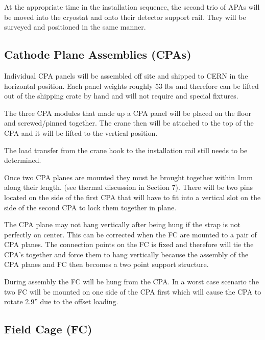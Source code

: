 At the appropriate time in the installation sequence, the second trio of APAs will be moved into the cryostat and onto their detector support rail.  They will be surveyed and positioned in the same manner.


\subsection{Cathode Plane Assemblies (CPAs)}



Individual CPA panels will be assembled off site and shipped to CERN in the horizontal position.  Each panel weights roughly 53 lbs and therefore can be lifted out of the shipping crate by hand and will not require and special fixtures.

The three CPA modules that made up a CPA panel will be placed on the floor and screwed/pinned together.   The crane then will be attached to the top of the CPA and it will be lifted to the vertical position.  

The load transfer from the crane hook to the installation rail still needs to be determined.  

Once two CPA planes are mounted they must be brought together within 1mm along their length.  (see thermal discussion in Section 7).  There will be two pins located on the side of the first CPA that will have to fit into a vertical slot on the side of the second CPA to lock them together in plane.  

The CPA plane may not hang vertically after being hung if the strap is not perfectly on center.  This can be corrected when the FC are mounted to a pair of CPA planes.  The connection points on the FC is fixed and therefore will tie the CPA’s together and force them to hang vertically because the assembly of the CPA planes and FC then becomes a two point support structure.  

During assembly the FC will be hung from the CPA.  In a worst case scenario the two FC will be mounted on one side of the CPA first which will cause the CPA to rotate 2.9'' due to the offset loading.  



\subsection{Field Cage (FC)}

